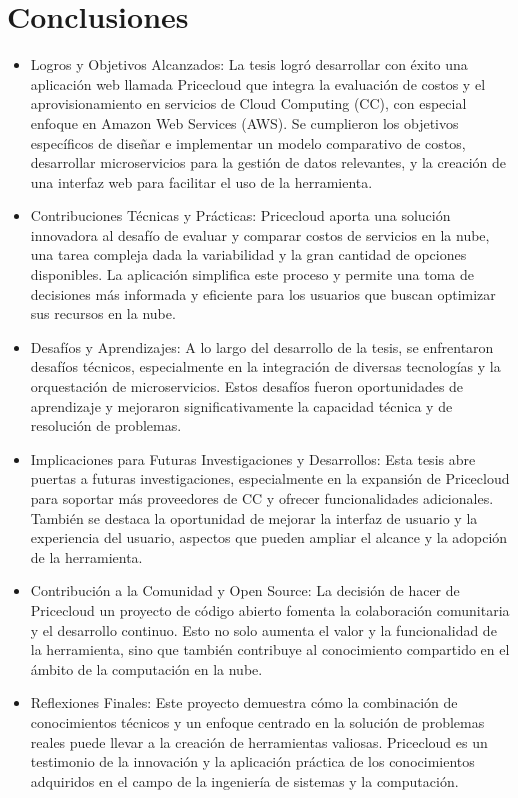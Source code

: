 
\chapter{Conclusiones} %

\begin{itemize}
    \item Logros y Objetivos Alcanzados: La tesis logró desarrollar con éxito una aplicación web llamada Pricecloud que integra la evaluación de costos y el aprovisionamiento en servicios de Cloud Computing (CC), con especial enfoque en Amazon Web Services (AWS). Se cumplieron los objetivos específicos de diseñar e implementar un modelo comparativo de costos, desarrollar microservicios para la gestión de datos relevantes, y la creación de una interfaz web para facilitar el uso de la herramienta.

    \item Contribuciones Técnicas y Prácticas: Pricecloud aporta una solución innovadora al desafío de evaluar y comparar costos de servicios en la nube, una tarea compleja dada la variabilidad y la gran cantidad de opciones disponibles. La aplicación simplifica este proceso y permite una toma de decisiones más informada y eficiente para los usuarios que buscan optimizar sus recursos en la nube.

    \item Desafíos y Aprendizajes: A lo largo del desarrollo de la tesis, se enfrentaron desafíos técnicos, especialmente en la integración de diversas tecnologías y la orquestación de microservicios. Estos desafíos fueron oportunidades de aprendizaje y mejoraron significativamente la capacidad técnica y de resolución de problemas.

    \item Implicaciones para Futuras Investigaciones y Desarrollos: Esta tesis abre puertas a futuras investigaciones, especialmente en la expansión de Pricecloud para soportar más proveedores de CC y ofrecer funcionalidades adicionales. También se destaca la oportunidad de mejorar la interfaz de usuario y la experiencia del usuario, aspectos que pueden ampliar el alcance y la adopción de la herramienta.

    \item Contribución a la Comunidad y Open Source: La decisión de hacer de Pricecloud un proyecto de código abierto fomenta la colaboración comunitaria y el desarrollo continuo. Esto no solo aumenta el valor y la funcionalidad de la herramienta, sino que también contribuye al conocimiento compartido en el ámbito de la computación en la nube.

    \item Reflexiones Finales: Este proyecto demuestra cómo la combinación de conocimientos técnicos y un enfoque centrado en la solución de problemas reales puede llevar a la creación de herramientas valiosas. Pricecloud es un testimonio de la innovación y la aplicación práctica de los conocimientos adquiridos en el campo de la ingeniería de sistemas y la computación.
\end{itemize}

